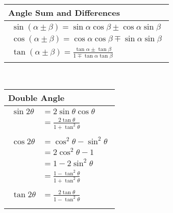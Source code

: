 \begin{minipage}{0.45\textwidth}
	\begin{table}[H]
		\centering
		\renewcommand{\arraystretch}{2.5}
		\begin{tabularx}{0.9\textwidth} { 
				| >{\centering\arraybackslash}X 
				|   }
			\hline
			\rowcolor{ocrel} \large \textbf{Angle Sum and Differences} \\
			\hline
			\hline
			$\begin{array}{l}
			\sin (\alpha \pm \beta)=\sin \alpha \cos \beta \pm \cos \alpha \sin \beta \\
			\cos (\alpha \pm \beta)=\cos \alpha \cos \beta \mp \sin \alpha \sin \beta \\
			\tan (\alpha \pm \beta)=\frac{\tan \alpha \pm \tan \beta}{1 \mp \tan \alpha \tan \beta}
			\end{array}$\\ \hline
			
			
		\end{tabularx}
		
	\end{table}
	
\end{minipage}\\
\begin{minipage}{0.45\textwidth}
	\begin{table}[H]
		\centering
		\renewcommand{\arraystretch}{2.5}
		\begin{tabularx}{0.9\textwidth} { 
				| >{\centering\arraybackslash}X 
				|   }
			\hline
			\rowcolor{ocrel} \large \textbf{Double Angle} \\
			\hline
			\hline
			$\begin{aligned} \sin 2 \theta &=2 \sin \theta \cos \theta \\ &=\frac{2 \tan \theta}{1+\tan ^{2} \theta} \\\\ \cos 2 \theta &=\cos ^{2} \theta-\sin ^{2} \theta \\ &=2 \cos ^{2} \theta-1 \\ &=1-2 \sin ^{2} \theta \\ &=\frac{1-\tan ^{2} \theta}{1+\tan ^{2} \theta} \\\\ \tan 2 \theta &=\frac{2 \tan \theta}{1-\tan ^{2} \theta} \end{aligned}$\\\\ \hline
			
			
		\end{tabularx}
		
	\end{table}
	
\end{minipage}
